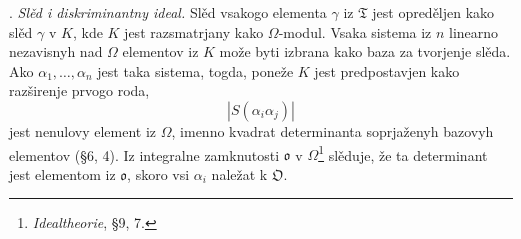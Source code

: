 \documentclass[11pt]{article}
\newcommand{\mo}{\mathfrak{o}}
\newcommand{\mO}{\mathfrak{O}}
\newcommand{\mT}{\mathfrak{T}}
\begin{document}
\setcounter{footnote}{33}

. \emph{Slěd i diskriminantny ideal.} Slěd vsakogo elementa $\gamma$ iz $\mT$ jest opreděljen kako slěd $\gamma$ v $K$, kde $K$ jest razsmatrjany kako $\Omega$-modul. Vsaka sistema iz $n$ linearno nezavisnyh nad $\Omega$ elementov iz $K$ može byti izbrana kako baza za tvorjenje slěda. Ako $\alpha_1,\ldots,\alpha_n$ jest taka sistema, togda, poneže $K$ jest predpostavjen kako razširenje prvogo roda,
\[
        |S(\alpha_i\alpha_j)|
\]
jest nenulovy element iz $\Omega$, imenno kvadrat determinanta soprjaženyh bazovyh elementov (§6, 4). Iz integralne zamknutosti $\mo$ v $\Omega$\footnote{\emph{Idealtheorie}, §9, 7.} slěduje, že ta determinant jest elementom iz $\mo$, skoro vsi $\alpha_i$ naležat k $\mO$.
\end{document}
